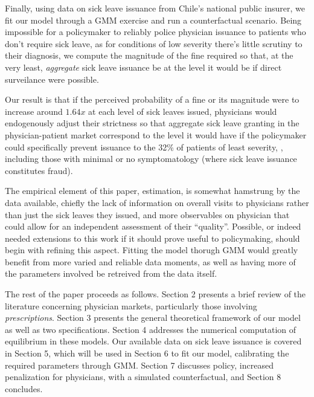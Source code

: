 \documentclass[../main.tex]{subfiles}
\begin{document}
Finally, using data on sick leave issuance from Chile's national public insurer, we fit our model through a GMM exercise and run a counterfactual scenario. Being impossible for a policymaker to reliably police physician issuance to patients who don't require sick leave, as for conditions of low severity there's little scrutiny to their diagnosis, we compute the magnitude of the fine required so that, at the very least, \textit{aggregate} sick leave issuance be at the level it would be if direct surveilance were possible.

Our result is that if the perceived probability of a fine or its magnitude were to increase around $1.64x$ at each level of sick leaves issued, physicians would endogenously adjust their strictness so that aggregate sick leave granting in the physician-patient market correspond to the level it would have if the policymaker could specifically prevent issuance to the 32\% of patients of least severity, , including those with minimal or no symptomatology (where sick leave issuance constitutes fraud).

The empirical element of this paper, estimation, is somewhat hamstrung by the data available, chiefly the lack of information on overall visits to physicians rather than just the sick leaves they issued, and more observables on physician that could allow for an independent assessment of their ``quality''. Possible, or indeed needed extensions to this work if it should prove useful to policymaking, should begin with refining this aspect. Fitting the model thorugh GMM would greatly benefit from more varied and reliable data moments, as well as having more of the parameters involved be retreived from the data itself.

The rest of the paper proceeds as follows. Section 2 presents a brief review of the literature concerning physician markets, particularly those involving \textit{prescriptions}. Section 3 presents the general theoretical framework of our model as well as two specifications. Section 4 addresses the numerical computation of equilibrium in these models. Our available data on sick leave issuance is covered in Section 5, which will be used in Section 6 to fit our model, calibrating the required parameters through GMM. Section 7 discusses policy, increased penalization for physicians, with a simulated counterfactual, and Section 8 concludes.
\end{document}
